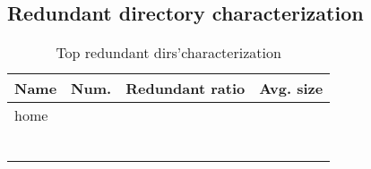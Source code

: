 \subsection{Redundant directory characterization}

\begin{table} 
	\centering 
	\scriptsize  
	\caption{Top redundant dirs'characterization} 
	\label{tbl:top_dup_dirs} 
	\begin{tabular}{|l|l|l|l|}%
		\hline 
		Name & Num. & Redundant ratio & Avg. size \\
		\hline
		home &   &   &     \\
		\hline
		&   &   &      \\
		\hline
		&   &   &      \\
		\hline
		&  &  &  \\
		\hline
		& &  &   \\
		\hline
		& &  &   \\
		\hline
		&  &  & \\
		\hline
	\end{tabular} 
\end{table} 


%
%

